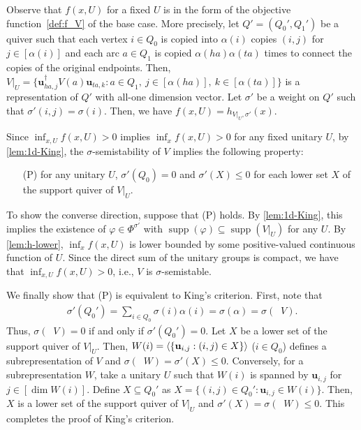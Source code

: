 \documentclass[a4paper,11pt]{article}
\numberwithin{equation}{section}
\newcommand{\bu}{\mathbf{u}}
\DeclareMathOperator{\supp}{supp}
\DeclareMathOperator{\dimv}{\underline{dim}}
\DeclarePairedDelimiter{\spnn}{\langle}{\rangle}
\begin{document}
Observe that $f(x, U)$ for a fixed $U$ is in the form of the objective function~\eqref{def:f_V} of the base case. 
More precisely, let $Q' = (Q_0', Q_1')$ be a quiver such that each vertex $i \in Q_0$ is copied into $\alpha(i)$ copies $(i, j)$ for $j \in [\alpha(i)]$ and each arc $a \in Q_1$ is copied $\alpha(ha)\alpha(ta)$ times to connect the copies of the original endpoints.
Then, $V|_U = \bigl\{\bu_{ha,j}^\dagger V(a) \bu_{ta,k} : a \in Q_1,\ j \in [\alpha(ha)],\ k \in [\alpha(ta)]\bigr\}$ is a representation of $Q'$ with all-one dimension vector.
Let $\sigma'$ be a weight on $Q'$ such that $\sigma'(i,j) = \sigma(i)$.
Then, we have $f(x, U) = h_{V|_U, \sigma'}(x)$.

Since $\inf_{x,U} f(x, U) > 0$ implies $\inf_{x} f(x, U) > 0$ for any fixed unitary $U$, by \cref{lem:1d-King}, the $\sigma$-semistability of $V$ implies the following property:
\begin{itemize}
    \item[(P)] for any unitary $U$, $\sigma'(Q_0) = 0$ and $\sigma'(X) \leq 0$ for each lower set $X$ of the support quiver of $V|_U$.
\end{itemize}
To show the converse direction, suppose that (P) holds.
By \cref{lem:1d-King}, this implies the existence of $\varphi \in \Phi^{\sigma'}$ with $\supp(\varphi) \subseteq \supp(V|_U)$ for any $U$.
By \cref{lem:h-lower}, $\inf_{x} f(x, U)$ is lower bounded by some positive-valued continuous function of $U$.
Since the direct sum of the unitary groups is compact, we have that $\inf_{x, U} f(x, U) > 0$, i.e., $V$ is $\sigma$-semistable.

We finally show that (P) is equivalent to King's criterion.
First, note that
\begin{align}
    \sigma'(Q_0') = \sum_{i \in Q_0} \sigma(i) \alpha(i) = \sigma(\alpha) = \sigma(\dimv V).
\end{align}
Thus, $\sigma(\dimv V) = 0$ if and only if $\sigma'(Q_0') = 0$.
Let $X$ be a lower set of the support quiver of $V|_U$.
Then, $W(i) = \spnn{ \{\bu_{i,j} : (i, j) \in X \}}$ ($i \in Q_0$) defines a subrepresentation of $V$ and $\sigma(\dimv W) = \sigma'(X) \leq 0$.
Conversely, for a subrepresentation $W$, take a unitary $U$ such that $W(i)$ is spanned by $\bu_{i, j}$ for $j \in [\dim W(i)]$.
Define $X \subseteq Q_0'$ as $X = \{ (i, j) \in Q_0' : \bu_{i,j} \in W(i) \}$.
Then, $X$ is a lower set of the support quiver of $V|_U$ and $\sigma'(X) = \sigma(\dimv W) \leq 0$.
This completes the proof of King's criterion.
\end{document}
